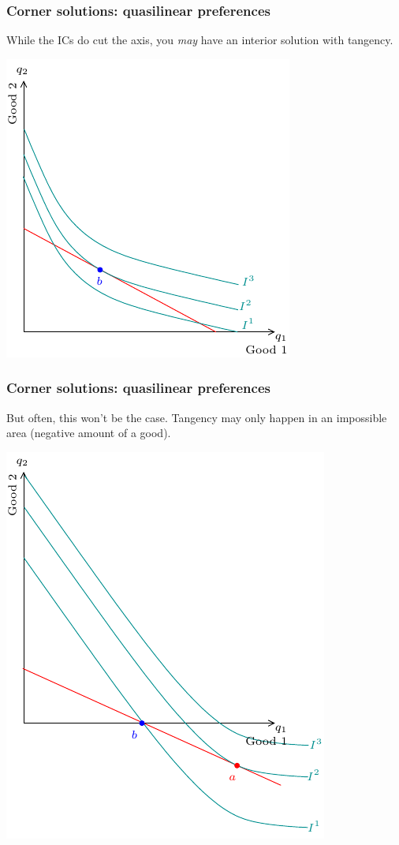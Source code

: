 \documentclass[xcolor=pdftex,dvipsnames]{beamer}
\begin{document}
\begin{frame}
\frametitle{Corner solutions: quasilinear preferences}
While the ICs do cut the axis, you \emph{may} have an interior
solution with tangency.
\begin{center}\includegraphics{pics/Qlinear1}\end{center}
\end{frame}
\begin{frame}
\frametitle{Corner solutions: quasilinear preferences}
But often, this won't be the case. Tangency may only happen in an
impossible area (negative amount of a good).
\begin{center}\includegraphics[scale=0.9]{pics/Qlinear2}\end{center}
\end{frame}
\end{document}
